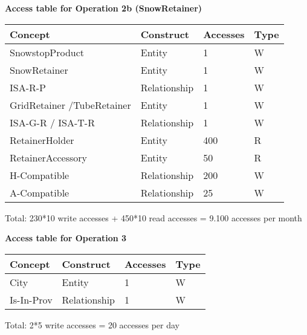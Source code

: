 {\centering \textbf{Access table for Operation 2b (SnowRetainer)}\\}
\begin{table}[H]
  \def\arraystretch{1.10}%
  \centering
  \begin{tabular}{ | m{4cm} | m{4cm}| m{3cm} | m{2cm} |}
    \hline
    {\textbf{\large Concept}} & {\textbf{\large Construct}} & {\textbf{\large Accesses}} & {\textbf{\large Type}} \\
    \hline
    \color[HTML]{3531FF} SnowstopProduct & Entity & 1 & W \\
    \hline
    \color[HTML]{3531FF} SnowRetainer & Entity & 1 & W \\
    \hline
    \color[HTML]{3531FF} ISA-R-P & Relationship & 1 & W \\
    \hline
    \color[HTML]{3531FF} GridRetainer /\newline TubeRetainer & Entity & 1 & W \\
    \hline
    \color[HTML]{3531FF} ISA-G-R / ISA-T-R & Relationship & 1 & W \\
    \hline
    \color[HTML]{3531FF} RetainerHolder & Entity & 400 & R \\
    \hline
    \color[HTML]{3531FF} RetainerAccessory & Entity & 50 & R \\
    \hline
    \color[HTML]{3531FF} H-Compatible & Relationship & 200 & W \\
    \hline
    \color[HTML]{3531FF} A-Compatible & Relationship & 25 & W \\
    \hline
  \end{tabular}
\end{table}
Total: 230*10 write accesses + 450*10 read accesses = 9.100 accesses per month

\pagebreak

{\centering \textbf{Access table for Operation 3}\\}
\begin{table}[H]
  \def\arraystretch{1.10}%
  \centering
  \begin{tabular}{ | m{4cm} | m{4cm}| m{3cm} | m{2cm} |}
    \hline
    {\textbf{\large Concept}} & {\textbf{\large Construct}} & {\textbf{\large Accesses}} & {\textbf{\large Type}} \\
    \hline
    \color[HTML]{3531FF} City & Entity & 1 & W \\
    \hline
    \color[HTML]{3531FF} Is-In-Prov & Relationship & 1 & W \\
    \hline
  \end{tabular}
\end{table}
Total: 2*5 write accesses = 20 accesses per day


